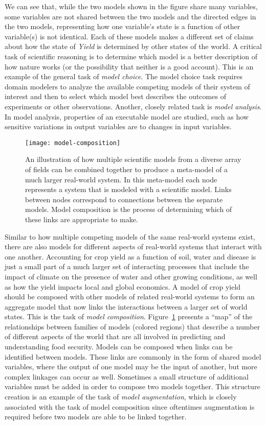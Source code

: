 We can see that, while the two models shown in the figure share many variables, some variables are not shared between the two models and the directed edges in the two models, representing how one variable’s state is a function of other variable(s) is not identical.
Each of these models makes a different set of claims about how the state of \emph{Yield} is determined by other states of the world.
A critical task of scientific reasoning is to determine which model is a better description of how nature works (or the possibility that neither is a good account).
This is an example of the general task of \textit{model choice}.
The model choice task requires domain modelers to analyze the available competing models of their system of interest and then to select which model best describes the outcomes of experiments or other observations.
Another, closely related task is \emph{model analysis}.
In model analysis, properties of an executable model are studied, such as how sensitive variations in output variables are to changes in input variables.

\begin{figure}[!htbp]
  \centering
  \texttt{[image: model-composition]}
  \caption[Model Composition Web]{An illustration of how multiple scientific models from a diverse array of fields can be combined together to produce a meta-model of a much larger real-world system. In this meta-model each node represents a system that is modeled with a scientific model. Links between nodes correspond to connections between the separate models. Model composition is the process of determining which of these links are appropriate to make.}
  \label{fig:composition_example}
\end{figure}

Similar to how multiple competing models of the same real-world systems exist, there are also models for different aspects of real-world systems that interact with one another.
Accounting for crop yield as a function of soil, water and disease is just a small part of a much larger set of interacting processes that include the impact of climate on the presence of water and other growing conditions, as well as how the yield impacts local and global economics. A model of crop yield should be composed with other models of related real-world systems to form an aggregate model that now links the interactions between a larger set of world states.
This is the task of \textit{model composition}.
Figure~\ref{fig:composition_example} presents a ``map'' of the relationships between families of models (colored regions) that describe a number of different aspects of the world that are all involved in predicting and understanding food security.
Models can be composed when links can be identified between models.
These links are commonly in the form of shared model variables, where the output of one model may be the input of another, but more complex linkages can occur as well.
Sometimes a small structure of additional variables must be added in order to compose two models together.
This structure creation is an example of the task of \textit{model augmentation}, which is closely associated with the task of model composition since oftentimes augmentation is required before two models are able to be linked together.

